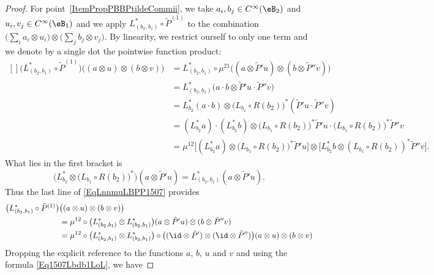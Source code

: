 \begin{proof}
	For point~\ref{ItemPropPBBPtildeCommii}, we take $a_i,b_j\in C^{\infty}(\eB_2)$ and $u_i,v_j\in C^{\infty}(\eB_1)$ and we apply $L^*_{(b_2,b_1)}\circ \tilde P^{(1)}$ to the combination $\big( \sum_ia_i\otimes u_i \big)\otimes\big( \sum_j b_j\otimes v_j \big)$. By linearity, we restrict ourself to only one term and we denote by a single dot the pointwise function product:
	\begin{equation}	\label{EqLnnmuLBPP1507}
		\begin{aligned}[]
			\big( L^*_{(b_2,b_1)}\circ\tilde P^{(1)} \big)\big( (a\otimes u)\otimes (b\otimes v) \big)&=
			L^*_{(b_2,b_1)}\circ\mu^{21}\big( (a\otimes \tilde P'u)\otimes(b\otimes \tilde P''v) \big)\\
			&=L^*_{(b_2,b_1)}\big( a\cdot b\otimes \tilde P'u\cdot\tilde P''v \big)\\
			&=L^*_{b_2}(a\cdot b)\otimes \big( L_{b_1}\circ R(b_2) \big)^*(\tilde P'u\cdot \tilde P''v)\\
			&=(L^*_{b_2}a)\cdot(L^*_{b_2}b)\otimes \big( L_{b_1}\circ R(b_2) \big)^*\tilde P'u\cdot \big( L_{b_1}\circ R(b_2) \big)^*\tilde P''v\\
			&=\mu^{12}\Big[ (L^*_{b_2}a)\otimes\big( L_{b_1}\circ R(b_2) \big)^*\tilde P'u \Big]\otimes\Big[ L^*_{b_2}b\otimes(L_{b_1}\circ R(b_2))^*\tilde P''v \Big].
		\end{aligned}
	\end{equation}
	What lies in the first bracket is
	\begin{equation}
		\Big( L^*_{b_2}\otimes\big( L_{b_1}\circ R(b_2) \big)^* \Big)(a\otimes \tilde P'u)=L_{(b_2,b_1)}^*(a\otimes \tilde P'u).
	\end{equation}
	Thus the last line of \eqref{EqLnnmuLBPP1507} provides
	\begin{equation}
		\begin{aligned}[]
			\big( L^*_{(b_2,b_1)}\circ\tilde P^{(1)} \big)&\big( (a\otimes u)\otimes (b\otimes v) \big)\\
			&=\mu^{12}\circ\big( L^*_{(b_2,b_1)}\otimes L^*_{(b_2,b_1)} \big)(a\otimes \tilde P'u)\otimes(b\otimes \tilde P''v)\\
			&=\mu^{12}\circ\big( L^*_{(b_2,b_1)}\otimes L^*_{(b_2,b_1)} \big)\circ\big( (\id\otimes\tilde P')\otimes(\id\otimes\tilde P'') \big)(a\otimes u)\otimes(b\otimes v)
		\end{aligned}
	\end{equation}
	Dropping the explicit reference to the functions $a$, $b$, $u$ and $v$ and using the formula \eqref{Eq1507Lbdb1LoL}, we have

\end{proof}
